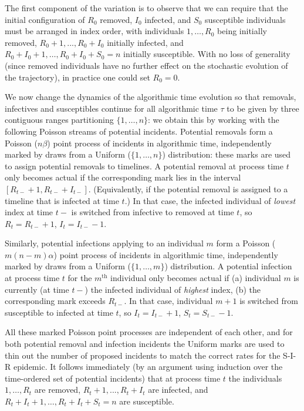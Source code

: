 \documentclass[]{article}
\newcommand{\SIR}{S-I-R\xspace}
\begin{document}
 The first component of the variation is to observe that we can require that the initial configuration of \(R_0\) removed, \(I_0\) infected, and \(S_0\) susceptible individuals must be arranged in index order, 
 with individuals \(1, \ldots, R_0\) being initially removed, \(R_0+1, ..., R_0+I_0\) initially infected, and \(R_0+I_0+1, \ldots, R_0+I_0+S_0=n\) initially susceptible.
 With no loss of generality (since removed individuals have no further effect on the stochastic evolution of the trajectory), in practice one could set \(R_0=0\).

 We now change the dynamics of the algorithmic time evolution so that removals, infectives and susceptibles continue for all algorithmic time \(\tau\) to be given by three contiguous ranges partitioning \(\{1, \ldots, n\}\): 
 we obtain this by working with the following Poisson streams of potential incidents.
 Potential removals form a Poisson (\(n\beta\)) point process of incidents in algorithmic time, 
 independently marked by draws from a Uniform (\(\{1, \ldots, n\}\))
 distribution: these marks are used to assign potential removals to timelines. A potential removal at process time \(t\) only becomes actual if the corresponding mark lies in the interval
 \([R_{t-}+1,R_{t-}+I_{t-}]\). (Equivalently, if the potential removal
 is assigned to a timeline that is infected at time \(t\).) In that
 case, the infected individual of \emph{lowest} index at time \(t-\) is switched from infective to removed at time \(t\), so \(R_t=R_{t-}+1\), \(I_t=I_{t-}-1\). 

Similarly, potential infections applying to an individual \(m\) form a Poisson (\(m (n-m)\alpha\)) point process of incidents in algorithmic time,  independently marked by draws from a Uniform (\(\{1, \ldots, m\}\)) distribution.
A potential infection at process time \(t\) for the \(m^\text{th}\) individual only becomes actual if (a) individual \(m\) is currently (at time \(t-\)) the infected individual of \emph{highest} index,
 (b) the corresponding mark exceeds \(R_{t-}\).
 In that case, individual \(m+1\) is switched from susceptible to infected at time \(t\), so \(I_t=I_{t-}+1\), \(S_t=S_{t-}-1\).
 
All these marked Poisson point processes are independent of each
other, and for both potential removal and infection incidents the Uniform marks are used to thin out the number of proposed incidents to match the correct rates for the \SIR epidemic. It follows immediately (by an argument using induction over the time-ordered set of potential incidents) that at process time \(t\)
 the individuals \(1, \ldots, R_t\) are removed, \(R_t+1, ..., R_t+I_t\) are infected, and \(R_t+I_t+1, \ldots, R_t+I_t+S_t=n\) are susceptible.
\end{document}
